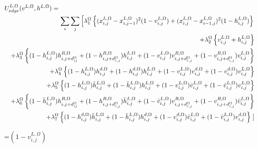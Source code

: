 {\newpage
\clearpage
\samepage \begin{eqnarray}\lefteqn{U^{L, \Omega}_{edge}(v^{L, \Omega},h^{L, \Omega})=} \nonumber \\ 
& & \sum_{i} \sum_{j} 
\left  [ 
  \lambda_1^{\Omega} \left \{ ( x_{i,j}^{L, \Omega} - x_{i,j-1}^{L, \Omega} )^{2} (1 - v_{i,j}^{L, \Omega} ) 
+ ( x_{i,j}^{L, \Omega} - x_{i-1,j}^{L, \Omega} )^{2} ( 1 - h_{i,j}^{L, \Omega} ) \right \} 
\right . \nonumber \\ 
& & +  \lambda_2^{\Omega} \left \{ v_{i,j}^{L, \Omega} +  h_{i,j}^{L, \Omega} \right \} \nonumber \\ 
& & +  \lambda_3^{\Omega} \left  \{ (1 - h_{i,j}^{L, \Omega})h^{R, \Omega}_{i,j+d^{\Omega}_{ij}} 
+ (1 - h^{R, \Omega}_{i,j+d^{\Omega}_{i,j}}) h_{i,j}^{L, \Omega}  
+  (1 - v_{i,j}^{L, \Omega})v^{R, \Omega}_{i,j+d^{\Omega}_{i,j}} 
+ (1 - v^{R, \Omega}_{i,j+d^{\Omega}_{i,j}}) v_{i,j}^{L, \Omega} \right \} \nonumber \\ 
& & +   \lambda_4^{\Omega} \left  \{ (1-h_{i,j}^{L, \Omega})h_{i,j}^{d, \Omega} 
+ (1-h_{i,j}^{d, \Omega})h_{i,j}^{L, \Omega} 
+  (1-v_{i,j}^{L, \Omega})v_{i,j}^{d, \Omega} 
+ (1-v_{i,j}^{d, \Omega})v_{i,j}^{L, \Omega}  \right \} \nonumber \\ 
& & + \lambda_5^{\Omega} \left \{(1-h_{i,j}^{L, \Omega}){\bar h}_{i,j}^{L, \Omega} + (1-{\bar h}_{i,j}^{L, \Omega})h_{i,j}^{L, \Omega}
+(1-v_{i,j}^{L, \Omega}){\bar v}_{i,j}^{L, \Omega} + (1-{\bar v}_{i,j}^{L, \Omega})v_{i,j}^{L, \Omega} \right \} \nonumber \\ 
& & +  \lambda_6^{\Omega} \left  \{ (1 - {\bar h}_{i,j}^{L,\Omega})h^{R,\Omega}_{i,j+d^{\Omega}_{ij}} 
+ (1 - h^{R,\Omega}_{i,j+d^{\Omega}_{i,j}}) {\bar h}_{i,j}^{L,\Omega}  
+  (1 - {\bar v}_{i,j}^{L,\Omega})v^{R,\Omega}_{i,j+d^{\Omega}_{i,j}} 
+ (1 - v^{R,\Omega}_{i,j+d^{\Omega}_{i,j}}) {\bar v}_{i,j}^{L,\Omega} \right \} \nonumber \\ 
& &  + \lambda_7^{\Omega} \left \{(1-h_{i,j}^{d, \Omega}){\bar h}_{i,j}^{L, \Omega} + (1-{\bar h}_{i,j}^{L, \Omega})h_{i,j}^{d, \Omega} + 
(1-v_{i,j}^{d, \Omega}) {\bar v}_{i,j}^{L, \Omega} + (1-{\bar v}_{i,j}^{L, \Omega})v_{i,j}^{d, \Omega} \right \} 
 \left . \right ]
\label{eq:4}
\end{eqnarray}
}

{\newpage
\clearpage
\samepage \setbox\sizebox=\hbox{$(1-v^{L,\Omega}_{i,j})$}\box\sizebox
}

